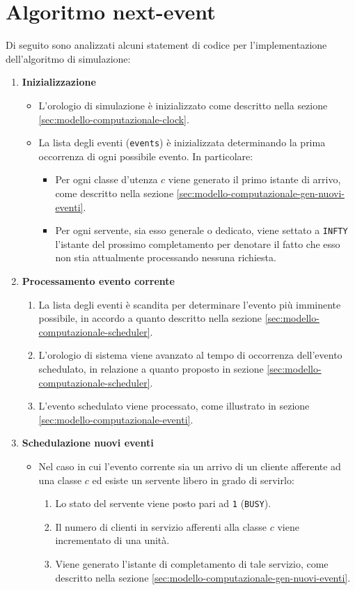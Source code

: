 \section{Algoritmo next-event}\label{sec:modello-computazionale-algoritmo}
Di seguito sono analizzati alcuni statement di codice per l'implementazione dell'algoritmo di simulazione:
\begin{enumerate}[label=Step \arabic*), align=left, leftmargin=*]
\item \textbf{Inizializzazione}
\begin{itemize}
\item L'orologio di simulazione è inizializzato come descritto nella sezione \ref{sec:modello-computazionale-clock}.
\item La lista degli eventi (\texttt{events}) è inizializzata determinando la prima occorrenza di ogni possibile evento. In particolare:
\begin{itemize}
\item Per ogni classe d'utenza $c$ viene generato il primo istante di arrivo, come descritto nella sezione \ref{sec:modello-computazionale-gen-nuovi-eventi}.

\item Per ogni servente, sia esso generale o dedicato, viene settato a \texttt{INFTY} l'istante del prossimo completamento per denotare il fatto che esso non stia attualmente processando nessuna richiesta.
\end{itemize}
\end{itemize}
\item \textbf{Processamento evento corrente}
\begin{enumerate}
\item La lista degli eventi è scandita per determinare l'evento più imminente possibile, in accordo a quanto descritto nella sezione \ref{sec:modello-computazionale-scheduler}.
\item L'orologio di sistema viene avanzato al tempo di occorrenza dell'evento schedulato, in relazione a quanto proposto in sezione \ref{sec:modello-computazionale-scheduler}.
\item L'evento schedulato viene processato, come illustrato in sezione \ref{sec:modello-computazionale-eventi}.
\end{enumerate}
\item \textbf{Schedulazione nuovi eventi}
\begin{itemize}
\item Nel caso in cui l'evento corrente sia un arrivo di un cliente afferente ad una classe $c$ ed esiste un servente libero in grado di servirlo:
\begin{enumerate}
\item Lo stato del servente viene posto pari ad \texttt{1} (\texttt{BUSY}).
\item Il numero di clienti in servizio afferenti alla classe $c$ viene incrementato di una unità.
\item Viene generato l'istante di completamento di tale servizio, come descritto nella sezione \ref{sec:modello-computazionale-gen-nuovi-eventi}.
\end{enumerate}


\end{itemize}
\end{enumerate}
